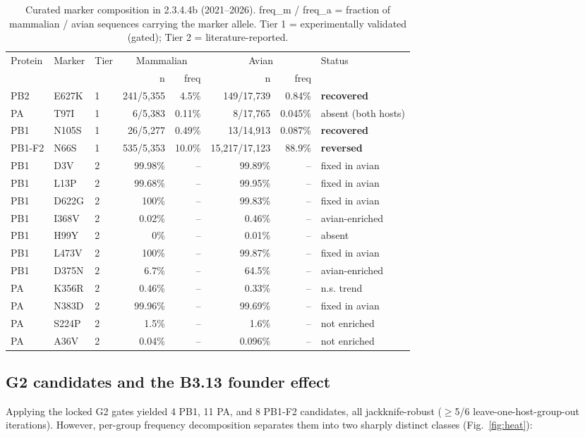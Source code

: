 \documentclass[11pt]{article}
\begin{document}
\begin{table}[!htbp]\centering\small
\caption{Curated marker composition in 2.3.4.4b (2021--2026). freq\_m / freq\_a = fraction of mammalian / avian sequences carrying the marker allele. Tier 1 = experimentally validated (gated); Tier 2 = literature-reported.}
\label{tab:markers}
\begin{tabular}{lllrrrrl}
\hline
Protein & Marker & Tier & \multicolumn{2}{c}{Mammalian} & \multicolumn{2}{c}{Avian} & Status \\
 & & & n & freq & n & freq & \\
\hline
PB2 & E627K & 1 & 241/5,355 & 4.5\% & 149/17,739 & 0.84\% & \textbf{recovered} \\
PA & T97I & 1 & 6/5,383 & 0.11\% & 8/17,765 & 0.045\% & absent (both hosts) \\
PB1 & N105S & 1 & 26/5,277 & 0.49\% & 13/14,913 & 0.087\% & \textbf{recovered} \\
PB1-F2 & N66S & 1 & 535/5,353 & 10.0\% & 15,217/17,123 & 88.9\% & \textbf{reversed} \\
PB1 & D3V & 2 & 99.98\% & -- & 99.89\% & -- & fixed in avian \\
PB1 & L13P & 2 & 99.68\% & -- & 99.95\% & -- & fixed in avian \\
PB1 & D622G & 2 & 100\% & -- & 99.83\% & -- & fixed in avian \\
PB1 & I368V & 2 & 0.02\% & -- & 0.46\% & -- & avian-enriched \\
PB1 & H99Y & 2 & 0\% & -- & 0.01\% & -- & absent \\
PB1 & L473V & 2 & 100\% & -- & 99.87\% & -- & fixed in avian \\
PB1 & D375N & 2 & 6.7\% & -- & 64.5\% & -- & avian-enriched \\
PA & K356R & 2 & 0.46\% & -- & 0.33\% & -- & n.s. trend \\
PA & N383D & 2 & 99.96\% & -- & 99.69\% & -- & fixed in avian \\
PA & S224P & 2 & 1.5\% & -- & 1.6\% & -- & not enriched \\
PA & A36V & 2 & 0.04\% & -- & 0.096\% & -- & not enriched \\
\hline
\end{tabular}
\end{table}

\subsection{G2 candidates and the B3.13 founder effect}
Applying the locked G2 gates yielded 4 PB1, 11 PA, and 8 PB1-F2 candidates, all jackknife-robust ($\geq$5/6 leave-one-host-group-out iterations). However, per-group frequency decomposition separates them into two sharply distinct classes (Fig.~\ref{fig:heat}):
\end{document}
